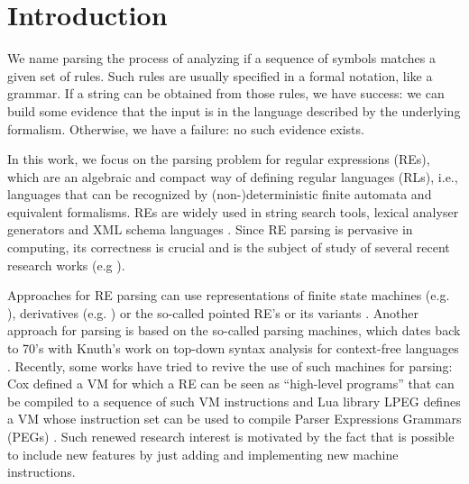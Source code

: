 \begin{coqdoccode}
\coqdocemptyline
\coqdocemptyline
\end{coqdoccode}


\section{Introduction}


\label{sec:intro}


We name parsing the process of analyzing if a sequence of symbols matches a given set of rules.
Such rules are usually specified in a formal notation, like a grammar. If a string can be obtained
from those rules, we have success: we can build some evidence that the input is in the language
described by the underlying formalism. Otherwise, we have a failure: no such evidence exists.


In this work, we focus on the parsing problem for regular expressions (REs), which are an algebraic
and compact way of defining regular languages (RLs), i.e., languages that can be recognized by
(non-)deterministic finite automata and equivalent formalisms. REs are widely used in string search
tools, lexical analyser generators and XML schema languages \cite{Frisch2004}. Since RE parsing
is pervasive in computing, its correctness is crucial and is the subject of study of several
recent research works (e.g \cite{Firsov13,Ribeiro2017,Lopes2016,Asperti10}).


Approaches for RE parsing can use representations of finite state machines (e.g. \cite{Firsov13}),
derivatives (e.g. \cite{Ribeiro2017,Lopes2018,Lopes2016}) or the so-called pointed RE's or its
variants \cite{Asperti10,Fischer2010}. Another approach for parsing is based on the so-called
parsing machines, which dates back to 70's with Knuth's work
on top-down syntax analysis for context-free languages \cite{Knuth71}. Recently, some works
have tried to revive the use of such machines for parsing: Cox \cite{Cox2009} defined a VM
for which a RE can be seen as ``high-level programs'' that can be compiled to a sequence of
such VM instructions and Lua library LPEG \cite{Ierusalimschy2009} defines a VM whose instruction
set can be used to compile Parser Expressions Grammars (PEGs) \cite{Ford04}. Such renewed research
interest is motivated by the fact that is possible to include new features by just adding and
implementing new machine instructions.


